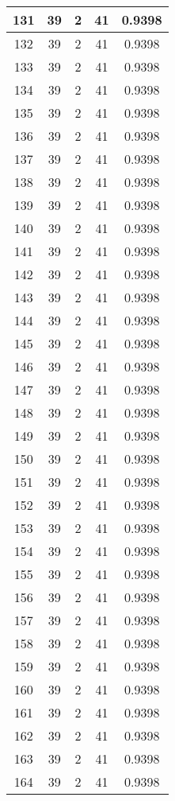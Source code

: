 \documentclass[letterpaper, 12pt]{article}
\begin{document}
\begin{longtable}{|c|c|c|c|c|}
\hline
131 & 39 & 2 & 41 & 0.9398 \\
\hline
132 & 39 & 2 & 41 & 0.9398 \\
\hline
133 & 39 & 2 & 41 & 0.9398 \\
\hline
134 & 39 & 2 & 41 & 0.9398 \\
\hline
135 & 39 & 2 & 41 & 0.9398 \\
\hline
136 & 39 & 2 & 41 & 0.9398 \\
\hline
137 & 39 & 2 & 41 & 0.9398 \\
\hline
138 & 39 & 2 & 41 & 0.9398 \\
\hline
139 & 39 & 2 & 41 & 0.9398 \\
\hline
140 & 39 & 2 & 41 & 0.9398 \\
\hline
141 & 39 & 2 & 41 & 0.9398 \\
\hline
142 & 39 & 2 & 41 & 0.9398 \\
\hline
143 & 39 & 2 & 41 & 0.9398 \\
\hline
144 & 39 & 2 & 41 & 0.9398 \\
\hline
145 & 39 & 2 & 41 & 0.9398 \\
\hline
146 & 39 & 2 & 41 & 0.9398 \\
\hline
147 & 39 & 2 & 41 & 0.9398 \\
\hline
148 & 39 & 2 & 41 & 0.9398 \\
\hline
149 & 39 & 2 & 41 & 0.9398 \\
\hline
150 & 39 & 2 & 41 & 0.9398 \\
\hline
151 & 39 & 2 & 41 & 0.9398 \\
\hline
152 & 39 & 2 & 41 & 0.9398 \\
\hline
153 & 39 & 2 & 41 & 0.9398 \\
\hline
154 & 39 & 2 & 41 & 0.9398 \\
\hline
155 & 39 & 2 & 41 & 0.9398 \\
\hline
156 & 39 & 2 & 41 & 0.9398 \\
\hline
157 & 39 & 2 & 41 & 0.9398 \\
\hline
158 & 39 & 2 & 41 & 0.9398 \\
\hline
159 & 39 & 2 & 41 & 0.9398 \\
\hline
160 & 39 & 2 & 41 & 0.9398 \\
\hline
161 & 39 & 2 & 41 & 0.9398 \\
\hline
162 & 39 & 2 & 41 & 0.9398 \\
\hline
163 & 39 & 2 & 41 & 0.9398 \\
\hline
164 & 39 & 2 & 41 & 0.9398 \\

\end{longtable}
\end{document}
